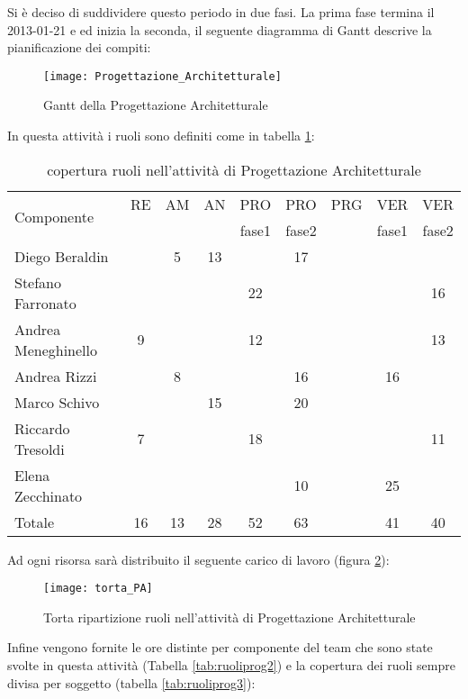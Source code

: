 Si è deciso di suddividere questo periodo in due fasi. La prima fase termina il 2013-01-21 e ed inizia la seconda, il seguente diagramma di Gantt descrive la pianificazione dei compiti:

\begin{figure}[h]
  \texttt{[image: Progettazione\_Architetturale]}
\caption{Gantt della Progettazione Architetturale}\label{fig:ganttprog}
\end{figure}

In questa attività i ruoli sono definiti come in tabella \ref{tab:ruoliprog}:

\begin{table}[h]
\centering
\begin{tabular}{|l|c|c|c|c|c|c|c|c|}
\hline
\multirow{2}{*}{Componente}& RE& AM& AN& PRO& PRO& PRG& VER& VER\\
                    &    &      &      &fase1          &fase2         &        &fase1	 &fase2\\ 
\hline
Diego Beraldin & & 5& 13& & 17& & &\\
Stefano Farronato & & & & 22& & & & 16\\
Andrea Meneghinello & 9& & & 12& & & & 13\\
Andrea Rizzi & & 8& & & 16& & 16& \\
Marco Schivo & & & 15& & 20& & & \\
Riccardo Tresoldi & 7& & & 18& & & & 11\\
Elena Zecchinato & & & & & 10& & 25& \\
\hline
Totale & 16& 13& 28& 52& 63& & 41& 40\\
\hline
\end{tabular}
\caption{copertura ruoli nell'attività di Progettazione Architetturale}\label{tab:ruoliprog}
\end{table}
\clearpage

Ad ogni risorsa sarà distribuito il seguente carico di lavoro (figura \ref{fig:ruoliprog}):
\begin{figure}[h!]
\centering
\texttt{[image: torta\_PA]}
\caption{Torta ripartizione ruoli nell'attività di Progettazione Architetturale}\label{fig:ruoliprog}
\end{figure}

Infine vengono fornite le ore distinte per componente del team che sono state svolte in questa attività (Tabella \ref{tab:ruoliprog2}) e la copertura dei ruoli sempre divisa per soggetto (tabella \ref{tab:ruoliprog3}):

